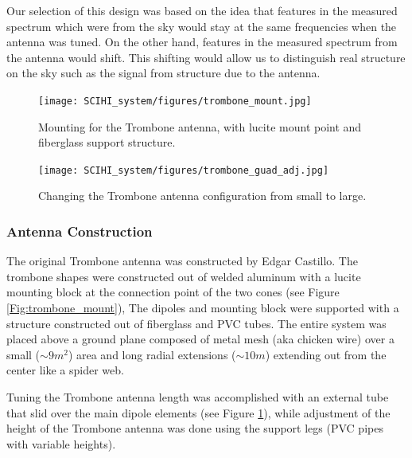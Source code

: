 Our selection of this design was based on the idea that features in the measured spectrum which were from the sky would stay at the same frequencies when the antenna was tuned. On the other hand, features in the measured spectrum from the antenna would shift. This shifting would allow us to distinguish real structure on the sky such as the \cm signal from structure due to the antenna. 

\begin{figure}[htb]
\centering
\begin{minipage}[b]{0.53\textwidth}
\centering
\texttt{[image: SCIHI\_system/figures/trombone\_mount.jpg]}
\caption{Mounting for the Trombone antenna, with lucite mount point and fiberglass support structure. }
\label{Fig:trombone_mount}
\end{minipage}%
\begin{minipage}[b]{0.02\textwidth}
\hspace{1cm}
\end{minipage}%
\begin{minipage}[b]{0.41\textwidth}
\centering
\texttt{[image: SCIHI\_system/figures/trombone\_guad\_adj.jpg]}
\caption{Changing the Trombone antenna configuration from small to large.}
\label{Fig:trombone_adj}
\end{minipage}
\end{figure}

\subsubsection{Antenna Construction}
The original Trombone antenna was constructed by Edgar Castillo. The trombone shapes were constructed out of welded aluminum with a lucite mounting block at the connection point of the two cones (see Figure \ref{Fig:trombone_mount}), The dipoles and mounting block were supported with a structure constructed out of fiberglass and PVC tubes. The entire system was placed above a ground plane composed of metal mesh (aka chicken wire) over a small ($\sim9 m^2$) area and long radial extensions ($\sim10 m$) extending out from the center like a spider web. 

Tuning the Trombone antenna length was accomplished with an external tube that slid over the main dipole elements (see Figure \ref{Fig:trombone_adj}), while adjustment of the height of the Trombone antenna was done using the support legs (PVC pipes with variable heights).


